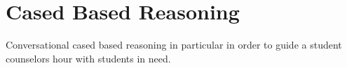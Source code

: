 \section{Cased Based Reasoning}
Conversational cased based reasoning in particular in order to guide a student counselors hour with students in need.